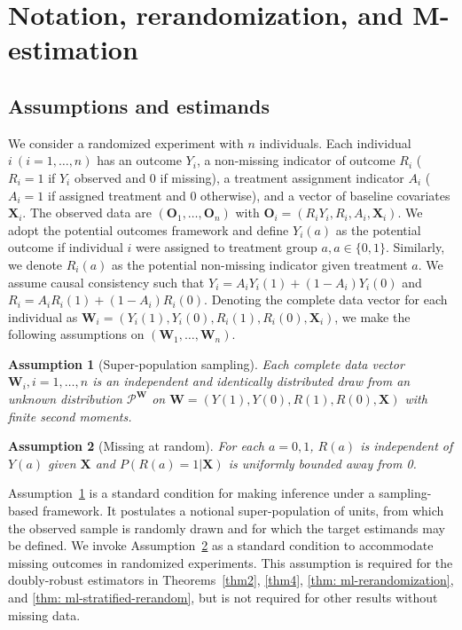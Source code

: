 \documentclass[12pt]{article}
\newtheorem{assumption}{Assumption}
\newcommand{\bX}{\boldsymbol{X}}\newcommand{\bO}{\boldsymbol{O}}
\newcommand{\bW}{\boldsymbol{W}}
\begin{document}
\section{Notation, rerandomization, and M-estimation}\label{sec:setup}
\subsection{Assumptions and estimands}
We consider a randomized experiment with $n$ individuals. Each individual $i\ (i=1,\dots,n)$ has an outcome $Y_i$, a non-missing indicator of outcome $R_i$ ($R_i=1$ if $Y_i$ observed and $0$ if missing), a treatment assignment indicator $A_i$ ($A_i=1$ if assigned treatment and $0$ otherwise), and a vector of baseline covariates $\bX_i$. The observed data are $(\bO_1,\dots, \bO_n)$ with $\bO_i = (R_iY_i, R_i, A_i, \bX_i)$. We adopt the potential outcomes framework and define $Y_i(a)$ as the potential outcome if individual $i$ were assigned to treatment group $a, a\in \{0,1\}$. Similarly, we denote $R_i(a)$ as the potential non-missing indicator given treatment $a$. We assume causal consistency such that $Y_i = A_iY_i(1)+(1-A_i)Y_i(0)$ and $R_i = A_iR_i(1)+(1-A_i)R_i(0)$. Denoting the complete data vector for each individual as $\bW_i = (Y_i(1), Y_i(0), R_i(1), R_i(0),\bX_i)$, we make the following assumptions on $(\bW_1,\dots, \bW_n)$.

\begin{assumption}[Super-population sampling]\label{assp1}
    Each complete data vector $\bW_i, i=1,\dots,n$ is an independent and identically distributed draw from an unknown distribution $\mathcal{P}^{\bW}$ on $\bW = (Y(1), Y(0), R(1), R(0),\bX)$ with finite second moments.
\end{assumption}

\begin{assumption}[Missing at random]\label{assp2}
For each $a =0,1$, $R(a)$ is independent of $Y(a)$ given $\bX$ and $P(R(a)=1|\bX)$ is uniformly bounded away from 0.
\end{assumption}

Assumption~\ref{assp1} is a standard condition for making inference under a sampling-based framework. It postulates a notional super-population of units, from which the observed sample is randomly drawn and for which the target estimands may be defined. 
We invoke Assumption~\ref{assp2} as a standard condition to accommodate missing outcomes in randomized experiments. This assumption is required for the doubly-robust estimators in Theorems~\ref{thm2}, \ref{thm4}, \ref{thm: ml-rerandomization}, and \ref{thm: ml-stratified-rerandom}, but is not required for other results without missing data. 
\end{document}
